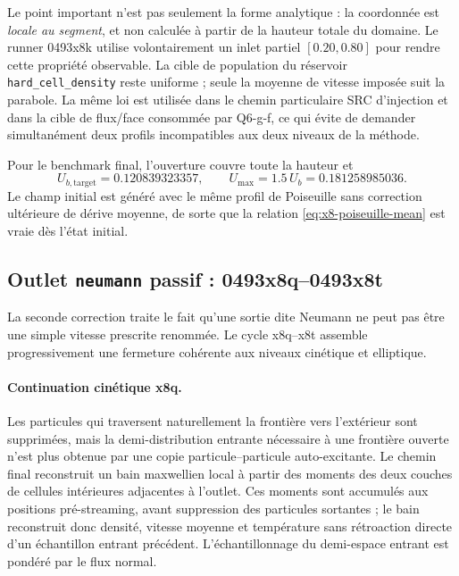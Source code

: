 \documentclass[11pt,a4paper]{article}
\begin{document}
Le point important n'est pas seulement la forme analytique : la coordonnée est \emph{locale au segment}, et non calculée à partir de la hauteur totale du domaine. Le runner 0493x8k utilise volontairement un inlet partiel $[0.20,0.80]$ pour rendre cette propriété observable. La cible de population du réservoir \texttt{hard\_cell\_density} reste uniforme ; seule la moyenne de vitesse imposée suit la parabole. La même loi est utilisée dans le chemin particulaire SRC d'injection et dans la cible de flux/face consommée par Q6-g-f, ce qui évite de demander simultanément deux profils incompatibles aux deux niveaux de la méthode.

Pour le benchmark final, l'ouverture couvre toute la hauteur et
\begin{equation}
  U_{b,\mathrm{target}}=0.120839323357,\qquad
  U_{\max}=1.5\,U_b=0.181258985036.
\end{equation}
Le champ initial est généré avec le même profil de Poiseuille sans correction ultérieure de dérive moyenne, de sorte que la relation \eqref{eq:x8-poiseuille-mean} est vraie dès l'état initial.

\subsection{Outlet \texttt{neumann} passif : 0493x8q--0493x8t}

La seconde correction traite le fait qu'une sortie dite Neumann ne peut pas être une simple vitesse prescrite renommée. Le cycle x8q--x8t assemble progressivement une fermeture cohérente aux niveaux cinétique et elliptique.

\paragraph{Continuation cinétique x8q.}
Les particules qui traversent naturellement la frontière vers l'extérieur sont supprimées, mais la demi-distribution entrante nécessaire à une frontière ouverte n'est plus obtenue par une copie particule--particule auto-excitante. Le chemin final reconstruit un bain maxwellien local à partir des moments des deux couches de cellules intérieures adjacentes à l'outlet. Ces moments sont accumulés aux positions pré-streaming, avant suppression des particules sortantes ; le bain reconstruit donc densité, vitesse moyenne et température sans rétroaction directe d'un échantillon entrant précédent. L'échantillonnage du demi-espace entrant est pondéré par le flux normal.
\end{document}
